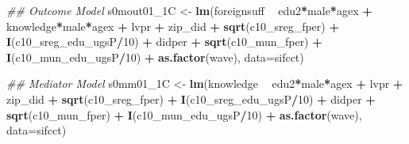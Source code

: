 \documentclass[
]{article}
\newenvironment{Shaded}{\begin{snugshade}}{\end{snugshade}}
\newcommand{\CommentTok}[1]{\textcolor[rgb]{0.56,0.35,0.01}{\textit{#1}}}
\newcommand{\DataTypeTok}[1]{\textcolor[rgb]{0.13,0.29,0.53}{#1}}
\newcommand{\DecValTok}[1]{\textcolor[rgb]{0.00,0.00,0.81}{#1}}
\newcommand{\KeywordTok}[1]{\textcolor[rgb]{0.13,0.29,0.53}{\textbf{#1}}}
\newcommand{\NormalTok}[1]{#1}
\newcommand{\OperatorTok}[1]{\textcolor[rgb]{0.81,0.36,0.00}{\textbf{#1}}}
\newcommand{\StringTok}[1]{\textcolor[rgb]{0.31,0.60,0.02}{#1}}
\begin{document}
\begin{Shaded}
\begin{Highlighting}[]
\CommentTok{## Outcome Model }
\NormalTok{s0mout01_1C <-}\StringTok{ }\KeywordTok{lm}\NormalTok{(foreignsuff  }\OperatorTok{~}\StringTok{ }\NormalTok{edu2}\OperatorTok{*}\NormalTok{male}\OperatorTok{*}\NormalTok{agex }\OperatorTok{+}\StringTok{ }\NormalTok{knowledge}\OperatorTok{*}\NormalTok{male}\OperatorTok{*}\NormalTok{agex }\OperatorTok{+}\StringTok{ }\NormalTok{lvpr }\OperatorTok{+}\StringTok{  }
\StringTok{                   }\NormalTok{zip_did }\OperatorTok{+}\StringTok{ }\KeywordTok{sqrt}\NormalTok{(c10_sreg_fper) }\OperatorTok{+}\StringTok{ }\KeywordTok{I}\NormalTok{(c10_sreg_edu_ugsP}\OperatorTok{/}\DecValTok{10}\NormalTok{) }\OperatorTok{+}\StringTok{ }
\StringTok{                   }\NormalTok{didper }\OperatorTok{+}\StringTok{ }\KeywordTok{sqrt}\NormalTok{(c10_mun_fper) }\OperatorTok{+}\StringTok{ }\KeywordTok{I}\NormalTok{(c10_mun_edu_ugsP}\OperatorTok{/}\DecValTok{10}\NormalTok{) }\OperatorTok{+}\StringTok{ }
\StringTok{                   }\KeywordTok{as.factor}\NormalTok{(wave), }\DataTypeTok{data=}\NormalTok{sifcct)}

\CommentTok{## Mediator Model}
\NormalTok{s0mm01_1C <-}\StringTok{ }\KeywordTok{lm}\NormalTok{(knowledge  }\OperatorTok{~}\StringTok{ }\NormalTok{edu2}\OperatorTok{*}\NormalTok{male}\OperatorTok{*}\NormalTok{agex }\OperatorTok{+}\StringTok{ }\NormalTok{lvpr }\OperatorTok{+}\StringTok{  }
\StringTok{                    }\NormalTok{zip_did }\OperatorTok{+}\StringTok{ }\KeywordTok{sqrt}\NormalTok{(c10_sreg_fper) }\OperatorTok{+}\StringTok{ }\KeywordTok{I}\NormalTok{(c10_sreg_edu_ugsP}\OperatorTok{/}\DecValTok{10}\NormalTok{) }\OperatorTok{+}\StringTok{ }
\StringTok{                    }\NormalTok{didper }\OperatorTok{+}\StringTok{ }\KeywordTok{sqrt}\NormalTok{(c10_mun_fper) }\OperatorTok{+}\StringTok{ }\KeywordTok{I}\NormalTok{(c10_mun_edu_ugsP}\OperatorTok{/}\DecValTok{10}\NormalTok{) }\OperatorTok{+}\StringTok{ }
\StringTok{                    }\KeywordTok{as.factor}\NormalTok{(wave), }\DataTypeTok{data=}\NormalTok{sifcct)}


\end{Highlighting}
\end{Shaded}
\end{document}
